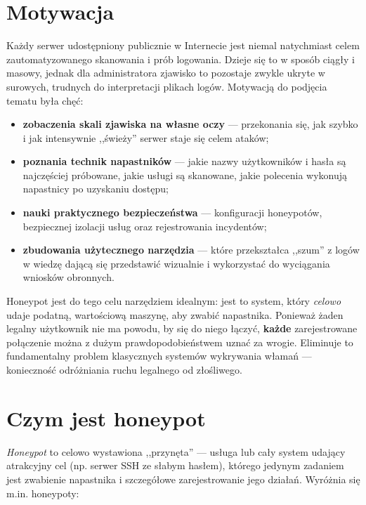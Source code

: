 \documentclass[12pt,a4paper]{report}
\begin{document}
\section{Motywacja}

Każdy serwer udostępniony publicznie w Internecie jest niemal natychmiast
celem zautomatyzowanego skanowania i prób logowania. Dzieje się to w sposób
ciągły i masowy, jednak dla administratora zjawisko to pozostaje zwykle ukryte
w surowych, trudnych do interpretacji plikach logów. Motywacją do podjęcia
tematu była chęć:

\begin{itemize}
  \item \textbf{zobaczenia skali zjawiska na własne oczy} --- przekonania się,
        jak szybko i jak intensywnie ,,świeży'' serwer staje się celem ataków;
  \item \textbf{poznania technik napastników} --- jakie nazwy użytkowników
        i hasła są najczęściej próbowane, jakie usługi są skanowane, jakie
        polecenia wykonują napastnicy po uzyskaniu dostępu;
  \item \textbf{nauki praktycznego bezpieczeństwa} --- konfiguracji honeypotów,
        bezpiecznej izolacji usług oraz rejestrowania incydentów;
  \item \textbf{zbudowania użytecznego narzędzia} --- które przekształca ,,szum''
        z logów w wiedzę dającą się przedstawić wizualnie i wykorzystać do
        wyciągania wniosków obronnych.
\end{itemize}

Honeypot jest do tego celu narzędziem idealnym: jest to system, który
\emph{celowo} udaje podatną, wartościową maszynę, aby zwabić napastnika.
Ponieważ żaden legalny użytkownik nie ma powodu, by się do niego łączyć,
\textbf{każde} zarejestrowane połączenie można z dużym prawdopodobieństwem uznać
za wrogie. Eliminuje to fundamentalny problem klasycznych systemów wykrywania
włamań --- konieczność odróżniania ruchu legalnego od złośliwego.

\section{Czym jest honeypot}

\emph{Honeypot} to celowo wystawiona ,,przynęta'' --- usługa lub cały system
udający atrakcyjny cel (np. serwer SSH ze słabym hasłem), którego jedynym
zadaniem jest zwabienie napastnika i szczegółowe zarejestrowanie jego działań.
Wyróżnia się m.in. honeypoty:
\end{document}
